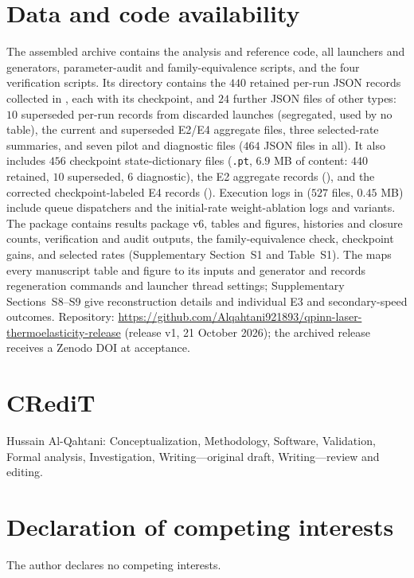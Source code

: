 \documentclass[11pt]{article}
\begin{document}
\section*{Data and code availability}
The assembled archive 
contains the analysis and reference code, all launchers and generators,
parameter-audit and family-equivalence scripts, and the four verification
scripts. Its  directory contains the $440$ retained
per-run JSON records collected in , each with its
checkpoint, and $24$ further JSON files of other types: $10$ superseded
per-run records from discarded launches (segregated, used by no table),
the current and superseded E2/E4 aggregate files, three selected-rate
summaries, and seven pilot and diagnostic files ($464$ JSON files in all).
It also includes $456$ checkpoint state-dictionary files (\texttt{.pt},
$6.9$ MB of content: $440$ retained, $10$ superseded, $6$ diagnostic), the E2
aggregate records (), and the corrected
checkpoint-labeled E4 records (). Execution logs in
 ($527$ files, $0.45$ MB) include queue dispatchers and the
initial-rate weight-ablation logs and variants. The package contains results package v6, tables and figures,
histories and closure counts, verification and audit outputs, the
family-equivalence check, checkpoint gains, and selected rates
(Supplementary Section~S1 and Table~S1). The 
maps every manuscript table and figure to its inputs and generator and
records regeneration commands and launcher thread settings; Supplementary
Sections~S8--S9 give reconstruction details and individual E3 and
secondary-speed outcomes. Repository: \url{https://github.com/Alqahtani921893/qpinn-laser-thermoelasticity-release}
(release v1, 21 October 2026); the archived release receives a Zenodo DOI at
acceptance.

\section*{CRediT}
Hussain Al-Qahtani: Conceptualization, Methodology, Software, Validation,
Formal analysis, Investigation, Writing---original draft,
Writing---review and editing.

\section*{Declaration of competing interests}
The author declares no competing interests.
\end{document}
